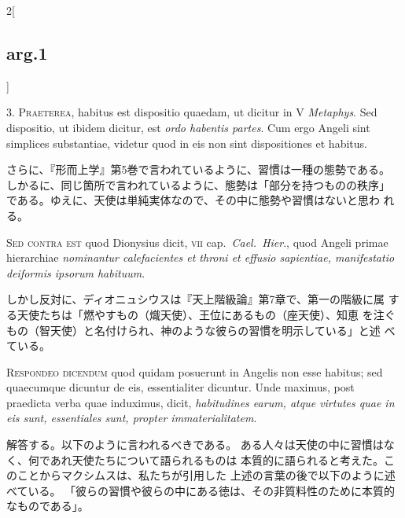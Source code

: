 \documentclass[paper=a4paper,fontsize=10pt,jafontsize=9pt,titlepage]{jlreq}
\begin{document}
\begin{paracol}{2}[\subsection{arg.1}]

3. {\scshape Praeterea}, habitus est dispositio quaedam, ut dicitur in
 V {\itshape Metaphys}. Sed dispositio, ut ibidem dicitur, est
 {\itshape ordo habentis partes}. Cum ergo Angeli sint simplices
 substantiae, videtur quod in eis non sint dispositiones et habitus.

\switchcolumn

さらに、『形而上学』第5巻で言われているように、習慣は一種の態勢である。
しかるに、同じ箇所で言われているように、態勢は「部分を持つものの秩序」
 である。ゆえに、天使は単純実体なので、その中に態勢や習慣はないと思わ
 れる。

\switchcolumn*[\subsection{s.c.}]

{\scshape Sed contra est} quod Dionysius dicit, {\scshape vii}
 cap.~{\itshape Cael.~Hier}., quod Angeli primae hierarchiae {\itshape
 nominantur calefacientes et throni et effusio sapientiae,
 manifestatio deiformis ipsorum habituum}.

\switchcolumn

しかし反対に、ディオニュシウスは『天上階級論』第7章で、第一の階級に属
 する天使たちは「燃やすもの（熾天使）、王位にあるもの（座天使）、知恵
 を注ぐもの（智天使）と名付けられ、神のような彼らの習慣を明示している」と述
 べている。


{\scshape Respondeo dicendum} quod quidam posuerunt in Angelis non
 esse habitus; sed quaecumque dicuntur de eis, essentialiter
 dicuntur. Unde maximus, post praedicta verba quae induximus, dicit,
 {\itshape habitudines earum, atque virtutes quae in eis sunt,
 essentiales sunt, propter immaterialitatem}.

\switchcolumn

解答する。以下のように言われるべきである。
ある人々は天使の中に習慣はなく、何であれ天使たちについて語られるものは
 本質的に語られると考えた。このことからマクシムスは、私たちが引用した
 上述の言葉の後で以下のように述べている。
「彼らの習慣や彼らの中にある徳は、その非質料性のために本質的なものである」。


\end{paracol}
\end{document}
